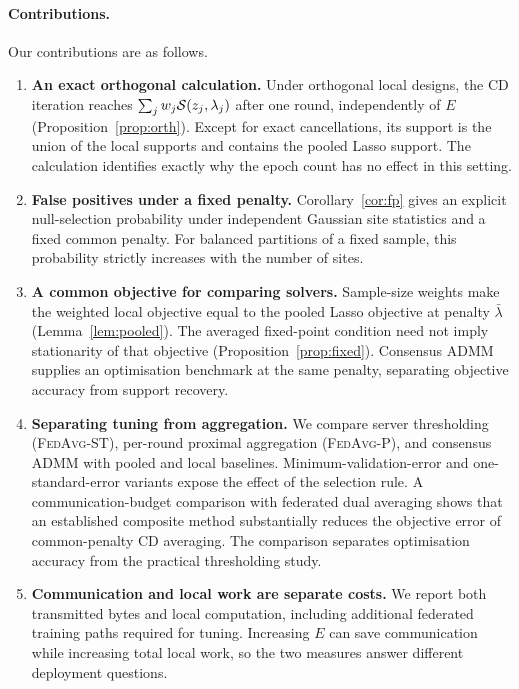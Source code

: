 \paragraph{Contributions.} Our contributions are as follows.

\begin{enumerate}
\item \textbf{An exact orthogonal calculation.} Under orthogonal local
designs, the CD iteration reaches
$\sum_jw_j\mathcal{S}(z_j,\lambda_j)$ after one round, independently of $E$
(Proposition~\ref{prop:orth}). Except for exact cancellations, its support
is the union of the local supports and contains the pooled Lasso support.
The calculation identifies exactly why the epoch count has no effect
in this setting.

\item \textbf{False positives under a fixed penalty.}
Corollary~\ref{cor:fp} gives an explicit null-selection probability under
independent Gaussian site statistics and a fixed common penalty. For
balanced partitions of a fixed sample, this probability strictly increases
with the number of sites.

\item \textbf{A common objective for comparing solvers.} Sample-size
weights make the weighted local objective equal to the pooled Lasso
objective at penalty $\bar\lambda$ (Lemma~\ref{lem:pooled}). The averaged
fixed-point condition need not imply stationarity of that objective
(Proposition~\ref{prop:fixed}). Consensus ADMM \citep{boyd2011} supplies
an optimisation benchmark at the same penalty, separating objective
accuracy from support recovery.

\item \textbf{Separating tuning from aggregation.} We compare
server thresholding (\textsc{FedAvg-ST}), per-round proximal
aggregation (\textsc{FedAvg-P}), and consensus ADMM with pooled and local
baselines. Minimum-validation-error and one-standard-error variants
expose the effect of the selection rule. A communication-budget comparison
with federated dual averaging shows that an established composite method
substantially reduces the objective error of common-penalty CD averaging.
The comparison separates optimisation accuracy from the practical
thresholding study.

\item \textbf{Communication and local work are separate costs.} We report
both transmitted bytes and local computation, including additional
federated training paths required for tuning. Increasing $E$ can save communication while
increasing total local work, so the two measures answer different
deployment questions.
\end{enumerate}

